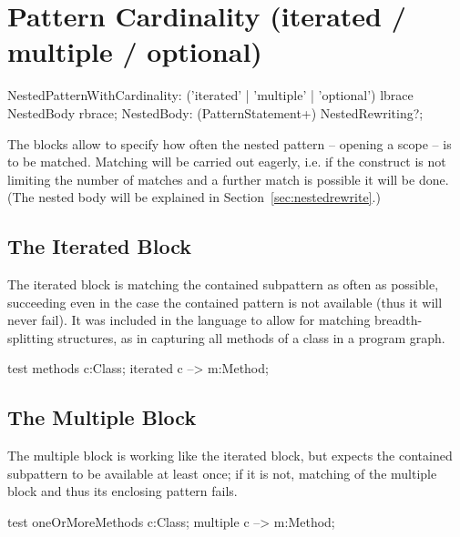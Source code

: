   
\section{Pattern Cardinality (iterated / multiple / optional)}
\label{cardinality}

\begin{rail}  
  NestedPatternWithCardinality: 
    ('iterated' | 'multiple' | 'optional') lbrace NestedBody rbrace;
  NestedBody: (PatternStatement+) NestedRewriting?;
\end{rail}

The  blocks allow to specify how often the nested pattern -- opening a scope -- is to be matched.
Matching will be carried out eagerly, i.e. if the construct is not limiting the number of matches and a further match is possible it will be done.
(The nested body will be explained in Section~\ref{sec:nestedrewrite}.)

\subsection*{The Iterated Block} 
The iterated block is matching the contained subpattern as often as possible, succeeding even in the case the contained pattern is not available (thus it will never fail).
It was included in the language to allow for matching breadth-splitting structures, as in capturing all methods of a class in a program graph.

\begin{example}
  \begin{grgen}
test methods
{
  c:Class;
  iterated {
    c --> m:Method;
  }  
}
  \end{grgen}
\end{example}

\subsection*{The Multiple Block}
The multiple block is working like the iterated block, but expects the contained subpattern to be available at least once; if it is not, matching of the multiple block and thus its enclosing pattern fails.

\begin{example}
  \begin{grgen}
test oneOrMoreMethods
{
  c:Class;
  multiple {
    c --> m:Method;
  }
}
  \end{grgen}
\end{example}

